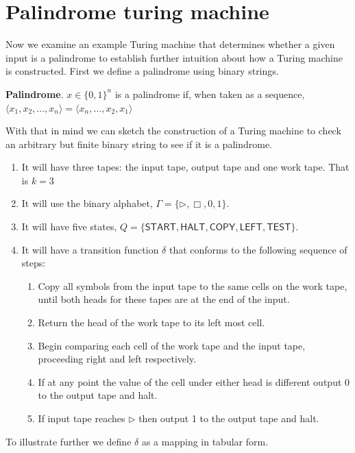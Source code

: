 \documentclass[usletter]{article}
\begin{document}
\section{Palindrome turing machine}

Now we examine an example Turing machine that determines whether a given input is a palindrome to establish further intuition about how a Turing machine is constructed. First we define a palindrome using binary strings.

\begin{definition}
  \textbf{Palindrome}. $x \in \{0, 1\}^n$ is a palindrome if, when taken as a sequence, $\langle x_1,x_2,\ldots,x_n \rangle = \langle x_n,\ldots,x_2,x_1\rangle$
\end{definition}

With that in mind we can sketch the construction of a Turing machine to check an arbitrary but finite binary string to see if it is a palindrome.

\begin{enumerate}
  \item It will have three tapes: the input tape, output tape and one work tape. That is $k = 3$
  \item It will use the binary alphabet, $\Gamma = \{\rhd, \Box, 0, 1\}$.
  \item It will have five states, $Q = \{ \textsf{START}, \textsf{HALT}, \textsf{COPY}, \textsf{LEFT}, \textsf{TEST}\} $.
  \item It will have a transition function $\delta$ that conforms to the following sequence of steps:
    \begin{enumerate}
      \item Copy all symbols from the input tape to the same cells on the work tape, until both heads for these tapes are at the end of the input.
      \item Return the head of the work tape to its left most cell.
      \item Begin comparing each cell of the work tape and the input tape, proceeding right and left respectively.
      \item If at any point the value of the cell under either head is different output 0 to the output tape and halt.
      \item If input tape reaches $\rhd$ then output 1 to the output tape and halt.
    \end{enumerate}
\end{enumerate}

To illustrate further we define $\delta$ as a mapping in tabular form.
\end{document}
